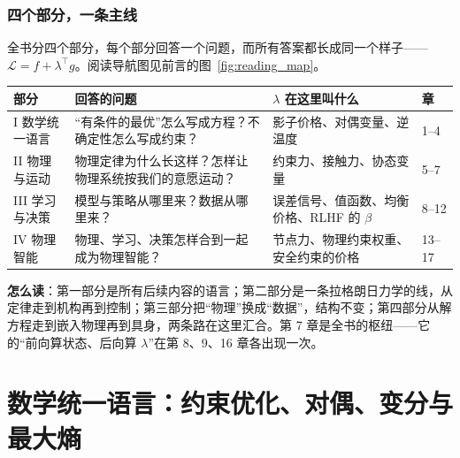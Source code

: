 \documentclass[11pt,a4paper,twoside,openright]{book}
\theoremstyle{definition}
\newcommand{\Lag}{\mathcal{L}}
\begin{document}
\section*{四个部分，一条主线}

全书分四个部分，每个部分回答一个问题，而所有答案都长成同一个样子——$\Lag = f + \lambda^\top g$。阅读导航图见前言的图~\ref{fig:reading_map}。

\begin{center}
\small
\begin{tabular}{@{}p{2.1cm}p{4.2cm}p{3.3cm}p{1.3cm}@{}}
\toprule
\textbf{部分} & \textbf{回答的问题} & \textbf{$\lambda$ 在这里叫什么} & \textbf{章} \\
\midrule
I 数学统一语言 & “有条件的最优”怎么写成方程？不确定性怎么写成约束？ & 影子价格、对偶变量、逆温度 & 1--4 \\
II 物理与运动 & 物理定律为什么长这样？怎样让物理系统按我们的意愿运动？ & 约束力、接触力、协态变量 & 5--7 \\
III 学习与决策 & 模型与策略从哪里来？数据从哪里来？ & 误差信号、值函数、均衡价格、RLHF 的 $\beta$ & 8--12 \\
IV 物理智能 & 物理、学习、决策怎样合到一起成为物理智能？ & 节点力、物理约束权重、安全约束的价格 & 13--17 \\
\bottomrule
\end{tabular}
\end{center}

\noindent\textbf{怎么读}：第一部分是所有后续内容的语言；第二部分是一条拉格朗日力学的线，从定律走到机构再到控制；第三部分把“物理”换成“数据”，结构不变；第四部分从解方程走到嵌入物理再到具身，两条路在这里汇合。第 7 章是全书的枢纽——它的“前向算状态、后向算 $\lambda$”在第 8、9、16 章各出现一次。



\part{数学统一语言：约束优化、对偶、变分与最大熵}
\end{document}

